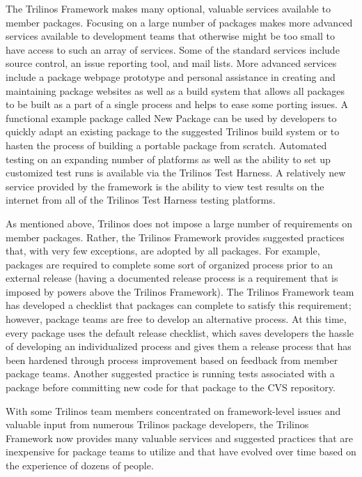 \documentclass[12pt,relax]{article}
\begin{document}
    The Trilinos Framework makes many optional, valuable services available to
    member packages.  Focusing on a large number of packages makes more advanced
    services available to development teams that otherwise might be too
    small to have access to such an array of services.  Some of the standard
    services include source control, an issue reporting tool, and mail lists.
    More advanced services include a package webpage prototype and personal 
    assistance in creating and maintaining package websites as well as a build 
    system that allows all packages to be built as a part of a single process 
    and helps to ease some porting issues.  A functional example package called
    New Package can be used by developers to quickly adapt an existing package 
    to the suggested Trilinos build system or to hasten the process of 
    building a portable package from scratch.  Automated testing on an expanding 
    number of platforms as well as the ability to set up customized test runs is 
    available via the Trilinos Test Harness.  A relatively new service provided 
    by  the framework is the ability to view test results on the internet from
    all of the Trilinos Test Harness testing platforms.
    
    As mentioned above, Trilinos does not impose a large number of requirements
    on member packages.  Rather, the Trilinos Framework provides suggested 
    practices that, with very few exceptions, are adopted by all packages.
    For example, packages are required to complete some sort of organized
    process prior to an external release (having a documented release
    process is a requirement that is imposed by powers above the Trilinos
    Framework).  The Trilinos Framework team has developed a checklist that
    packages can complete to satisfy this requirement; however, package teams
    are free to develop an alternative process.  At this time, every package
    uses the default release checklist, which saves developers the hassle of
    developing an individualized process and gives them a release process that
    has been hardened through process improvement based on feedback from
    member package teams.  Another suggested practice is running tests
    associated with a package before committing new code for that package to the 
    CVS repository.
  
    With some Trilinos team members concentrated on framework-level issues and
    valuable input from numerous Trilinos package developers, the Trilinos 
    Framework now provides many valuable services and suggested practices that
    are inexpensive for package teams to utilize and that have evolved over 
    time based on the experience of dozens of people.  
  
\end{document}
